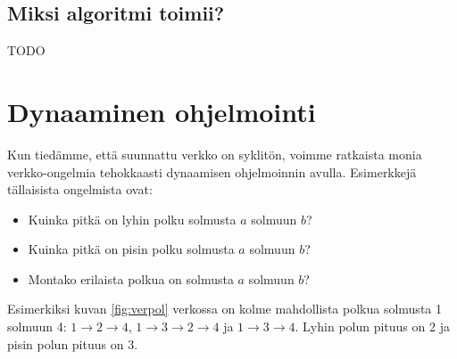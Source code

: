 \subsection{Miksi algoritmi toimii?}

TODO

\section{Dynaaminen ohjelmointi}

Kun tiedämme, että suunnattu verkko on syklitön,
voimme ratkaista monia verkko-ongelmia tehokkaasti
dynaamisen ohjelmoinnin avulla.
Esimerkkejä tällaisista ongelmista ovat:

\begin{itemize}
\item Kuinka pitkä on lyhin polku solmusta $a$ solmuun $b$?
\item Kuinka pitkä on pisin polku solmusta $a$ solmuun $b$?
\item Montako erilaista polkua on solmusta $a$ solmuun $b$?
\end{itemize}

Esimerkiksi kuvan \ref{fig:verpol} verkossa on kolme
mahdollista polkua solmusta 1 solmuun 4:
$1 \rightarrow 2 \rightarrow 4$,
$1 \rightarrow 3 \rightarrow 2 \rightarrow 4$ ja
$1 \rightarrow 3 \rightarrow 4$.
Lyhin polun pituus on 2 ja pisin polun pituus on 3.

